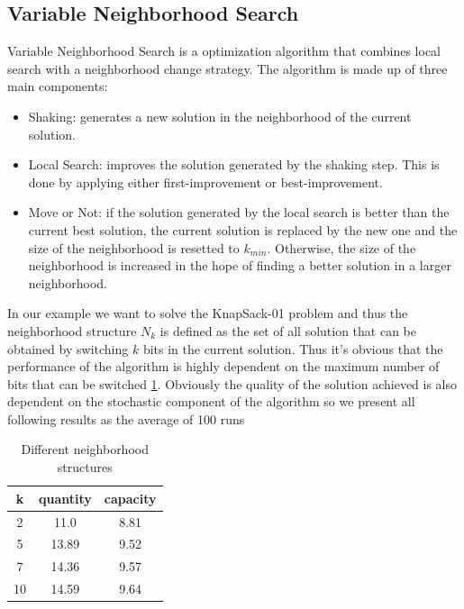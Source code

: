 \subsection{Variable Neighborhood Search}
Variable Neighborhood Search is a optimization algorithm that combines local search with a neighborhood change strategy. The algorithm is made up of three main components:
\begin{itemize}
    \item Shaking: generates a new solution in the neighborhood of the current solution.
    \item Local Search: improves the solution generated by the shaking step. This is done by applying either first-improvement or best-improvement.
    \item Move or Not: if the solution generated by the local search is better than the current best solution, the current solution is replaced by the new one and the size of the neighborhood is resetted to $k_{min}$. Otherwise, the size of the neighborhood is increased in the hope of finding a better solution in a larger neighborhood.
\end{itemize}

In our example we want to solve the KnapSack-01 problem and  thus the neighborhood structure $N_k$ is defined as the set of all solution that can be obtained by switching $k$ bits in the current solution. Thus it's obvious that the performance of the algorithm is highly dependent on the maximum number of bits that can be switched \ref{tab:neighborhood}. Obviously the quality of the solution achieved is also dependent on the stochastic component of the algorithm so we present all following results as the average of 100 runs
\begin{table}[H]
    \centering
    \begin{tabular}{c||c |c}
        k  & quantity & capacity \\ \hline
        2  & 11.0     & 8.81     \\
        5  & 13.89    & 9.52     \\
        7  & 14.36    & 9.57     \\
        10 & 14.59    & 9.64     \\
    \end{tabular}
    \caption{Different neighborhood structures}
    \label{tab:neighborhood}
\end{table}

